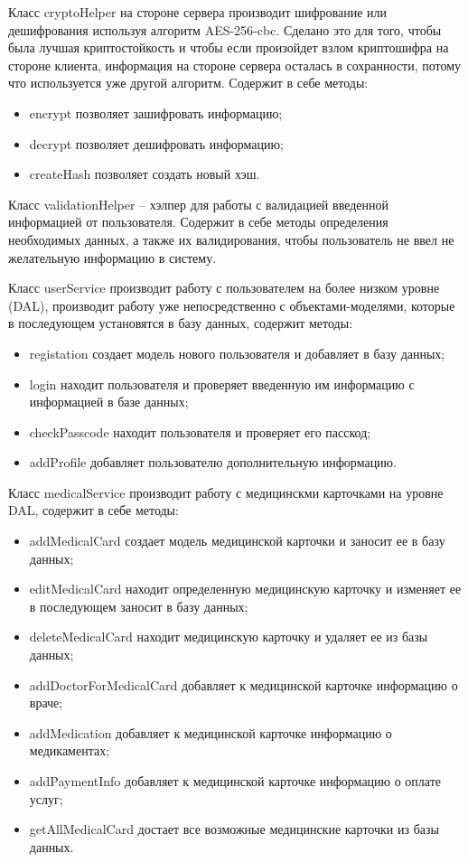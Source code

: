 Класс cryptoHelper на стороне сервера производит шифрование или дешифрования используя алгоритм AES-256-cbc. Сделано это для того, чтобы была лучшая криптостойкость и чтобы если произойдет взлом криптошифра на стороне клиента, информация на стороне сервера осталась в сохранности, потому что используется уже другой алгоритм. Содержит в себе методы:
\begin{itemize}
  \item encrypt позволяет зашифровать информацию;
  \item decrypt позволяет дешифровать информацию;
  \item createHash позволяет создать новый хэш.
\end{itemize}

Класс validationHelper -- хэлпер для работы с валидацией введенной информацией от пользователя. Содержит в себе методы определения необходимых данных, а также их валидирования, чтобы пользователь не ввел не желательную информацию в систему.

Класс userService производит работу с пользователем на более низком уровне (DAL), производит работу уже непосредственно с объектами-моделями, которые в последующем установятся в базу данных, содержит методы:
\begin{itemize}
  \item registation создает модель нового пользователя и добавляет в базу данных;
  \item login находит пользователя и проверяет введенную им информацию с информацией в базе данных;
  \item checkPasscode находит пользователя и проверяет его пасскод;
  \item addProfile добавляет пользователю дополнительную информацию.
\end{itemize}

Класс medicalService производит работу с медицинскми карточками на уровне DAL, содержит в себе методы:
\begin{itemize}
  \item addMedicalCard создает модель медицинской карточки и заносит ее в базу данных;
  \item editMedicalCard находит определенную медицинскую карточку и изменяет ее в последующем заносит в базу данных;
  \item deleteMedicalCard находит медицинскую карточку и удаляет ее из базы данных;
  \item addDoctorForMedicalCard добавляет к медицинской карточке информацию о враче;
  \item addMedication добавляет к медицинской карточке информацию о медикаментах;
  \item addPaymentInfo добавляет к медицинской карточке информацию о оплате услуг;
  \item getAllMedicalCard достает все возможные медицинские карточки из базы данных.
\end{itemize}

